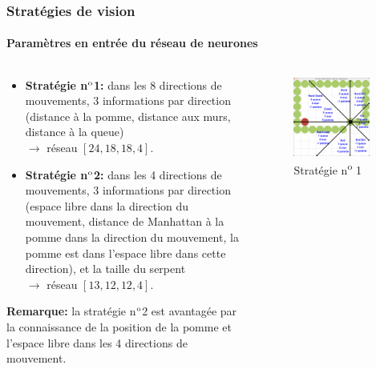 \documentclass[10pt]{beamer}
\begin{document}
\begin{frame}
\frametitle{Stratégies de vision}
\framesubtitle{Paramètres en entrée du réseau de neurones}
\begin{columns}[T]
\begin{column}{0.60\textwidth}
\footnotesize
\begin{itemize}
\footnotesize
\item \textbf{Stratégie n$\textsuperscript{o}$1:} dans les 8 directions de mouvements, 3 informations par direction (distance à la pomme, distance aux murs, distance à la queue)\\
$\rightarrow$ réseau $\left[24, 18, 18, 4\right]$.
\item \textbf{Stratégie n$\textsuperscript{o}$2:} dans les 4 directions de mouvements, 3 informations par direction (espace libre dans la direction du mouvement, distance de Manhattan à la pomme dans la direction du mouvement, la pomme est dans l'espace libre dans cette direction), et la taille du serpent\\
$\rightarrow$ réseau $\left[13, 12, 12, 4\right]$.
\end{itemize}

\vspace{0.3cm}
\textbf{Remarque:} la stratégie n$\textsuperscript{o}$2 est avantagée par la connaissance de la position de la pomme et l'espace libre dans les 4 directions de mouvement.
\end{column}
\begin{column}{0.40\textwidth}

\begin{figure}
\vspace{-1.7cm}
\includegraphics[width=0.9\textwidth]{snake_vision_illustration1.png}
\caption*{\tiny Stratégie n\textsuperscript{o} 1}
\end{figure}


\end{column}
\end{columns}
\end{frame}
\end{document}
